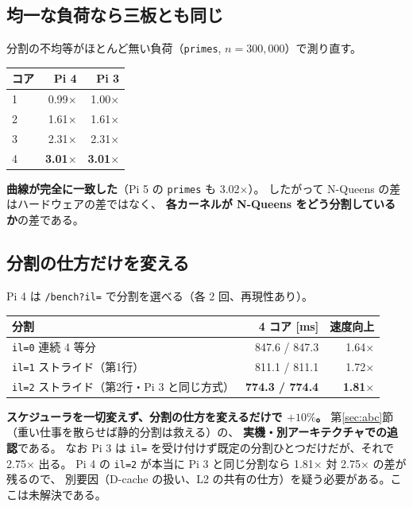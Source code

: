 \documentclass[a4paper,11pt]{ltjsarticle}
\begin{document}
\subsection{均一な負荷なら三板とも同じ}

分割の不均等がほとんど無い負荷（\texttt{primes}, $n=300{,}000$）で測り直す。

\begin{center}
\begin{tabular}{lrr}
\toprule
コア & Pi 4 & Pi 3 \\
\midrule
1 & 0.99$\times$ & 1.00$\times$ \\
2 & 1.61$\times$ & 1.61$\times$ \\
3 & 2.31$\times$ & 2.31$\times$ \\
4 & \textbf{3.01}$\times$ & \textbf{3.01}$\times$ \\
\bottomrule
\end{tabular}
\end{center}

\noindent
\textbf{曲線が完全に一致した}（Pi 5 の \texttt{primes} も 3.02$\times$）。
したがって N-Queens の差はハードウェアの差ではなく、
\textbf{各カーネルが N-Queens をどう分割しているか}の差である。

\subsection{分割の仕方だけを変える}

Pi 4 は \texttt{/bench?il=} で分割を選べる（各 2 回、再現性あり）。

\begin{center}
\begin{tabular}{lrr}
\toprule
分割 & 4 コア [ms] & 速度向上 \\
\midrule
\texttt{il=0} 連続 4 等分 & 847.6 / 847.3 & 1.64$\times$ \\
\texttt{il=1} ストライド（第1行） & 811.1 / 811.1 & 1.72$\times$ \\
\texttt{il=2} ストライド（第2行・Pi 3 と同じ方式） & \textbf{774.3 / 774.4} & \textbf{1.81}$\times$ \\
\bottomrule
\end{tabular}
\end{center}

\noindent
\textbf{スケジューラを一切変えず、分割の仕方を変えるだけで $+10\%$。}
第\ref{sec:abc}節（重い仕事を散らせば静的分割は救える）の、
\textbf{実機・別アーキテクチャでの追認}である。
なお Pi 3 は \texttt{il=} を受け付けず既定の分割ひとつだけだが、それで 2.75$\times$ 出る。
Pi 4 の \texttt{il=2} が本当に Pi 3 と同じ分割なら 1.81$\times$ 対 2.75$\times$ の差が残るので、
別要因（D-cache の扱い、L2 の共有の仕方）を疑う必要がある。ここは未解決である。
\end{document}
